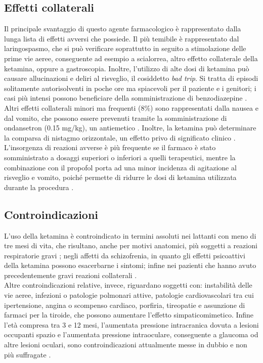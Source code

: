 \subsection*{Effetti collaterali}

Il principale svantaggio di questo agente farmacologico è rappresentato dalla lunga lista di effetti avversi che possiede. Il più temibile è rappresentato dal laringospasmo, che si può verificare soprattutto in seguito a stimolazione delle prime vie aeree, conseguente ad esempio a scialorrea, altro effetto collaterale della ketamina, oppure a gastroscopia. Inoltre, l'utilizzo di alte dosi di ketamina può causare allucinazioni e deliri al risveglio, il cosiddetto \emph{bad trip}. Si tratta di episodi solitamente autorisolventi in poche ore ma spiacevoli per il paziente e i genitori; i casi più intensi possono beneficiare della somministrazione di benzodiazepine \cite{Simeupsedazione}. Altri effetti collaterali minori ma frequenti (8\%) sono rappresentati dalla nausea e dal vomito, che possono essere prevenuti tramite la somministrazione di ondansetron (0.15 mg/kg), un antiemetico \cite{Uptodatepharmacology}. Inoltre, la ketamina può determinare la comparsa di nistagmo orizzontale, un effetto privo di significato clinico \cite{Simeupsedazione}. 
\\L'insorgenza di reazioni avverse è più frequente se il farmaco è stato somministrato a dosaggi superiori o inferiori a quelli terapeutici, mentre la combinazione con il propofol porta ad una minor incidenza di agitazione al risveglio e vomito, poiché permette di ridurre le dosi di ketamina utilizzata durante la procedura \cite{Simeupsedazione, Shah2011}. 

\subsection*{Controindicazioni}

L'uso della ketamina è controindicato in termini assoluti nei lattanti con meno di tre mesi di vita, che risultano, anche per motivi anatomici, più soggetti a reazioni respiratorie gravi \cite{Zanos2018}; negli affetti da schizofrenia, in quanto gli effetti psicoattivi della ketamina possono esacerbarne i sintomi; infine nei pazienti che hanno avuto precedentemente gravi reazioni collaterali \cite{Uptodatepharmacology}.
\\Altre controindicazioni relative, invece, riguardano soggetti con: instabilità delle vie aeree, infezioni o patologie polmonari attive, patologie cardiovascolari tra cui ipertensione, angina o scompenso cardiaco, porfiria, tireopatie e assunzione di farmaci per la tiroide, che possono aumentare l'effetto simpaticomimetico. Infine l'età compresa tra 3 e 12 mesi, l'aumentata pressione intracranica dovuta a lesioni occupanti spazio e l'aumentata pressione intraoculare, conseguente a glaucoma od altre lesioni oculari, sono controindicazioni attualmente messe in dubbio e non più suffragate \cite{Green2011, Simeupsedazione}.   

